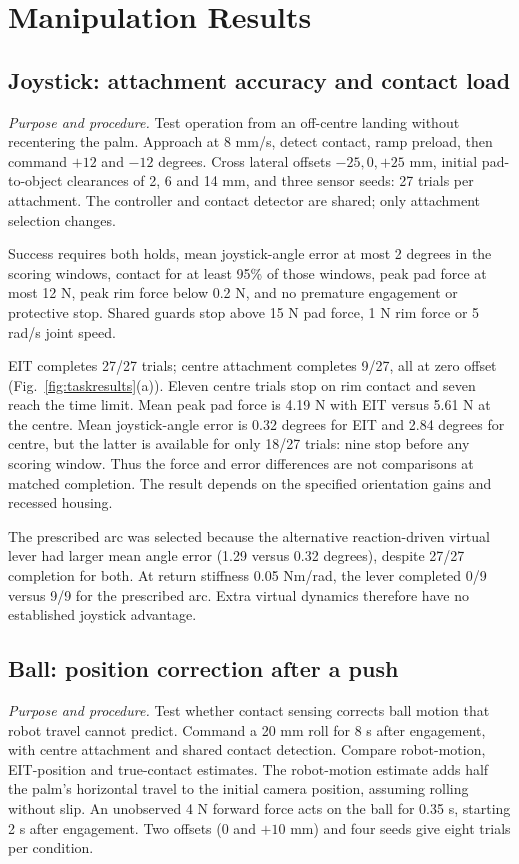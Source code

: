 \documentclass[letterpaper,10pt,conference]{IEEEtran}
\begin{document}
\section{Manipulation Results}\label{sec:tasks}
\subsection{Joystick: attachment accuracy and contact load}
\textit{Purpose and procedure.} Test operation from an off-centre landing without recentering the palm. Approach at 8 mm/s, detect contact, ramp preload, then command $+12$ and $-12$ degrees. Cross lateral offsets $-25,0,+25$ mm, initial pad-to-object clearances of 2, 6 and 14 mm, and three sensor seeds: 27 trials per attachment. The controller and contact detector are shared; only attachment selection changes.

Success requires both holds, mean joystick-angle error at most 2 degrees in the scoring windows, contact for at least 95\% of those windows, peak pad force at most 12 N, peak rim force below 0.2 N, and no premature engagement or protective stop. Shared guards stop above 15 N pad force, 1 N rim force or 5 rad/s joint speed.

EIT completes 27/27 trials; centre attachment completes 9/27, all at zero offset (Fig.~\ref{fig:taskresults}(a)). Eleven centre trials stop on rim contact and seven reach the time limit. Mean peak pad force is 4.19 N with EIT versus 5.61 N at the centre. Mean joystick-angle error is 0.32 degrees for EIT and 2.84 degrees for centre, but the latter is available for only 18/27 trials: nine stop before any scoring window. Thus the force and error differences are not comparisons at matched completion. The result depends on the specified orientation gains and recessed housing.

The prescribed arc was selected because the alternative reaction-driven virtual lever had larger mean angle error (1.29 versus 0.32 degrees), despite 27/27 completion for both. At return stiffness 0.05 Nm/rad, the lever completed 0/9 versus 9/9 for the prescribed arc. Extra virtual dynamics therefore have no established joystick advantage.

\subsection{Ball: position correction after a push}\label{sec:ballfollowup}
\textit{Purpose and procedure.} Test whether contact sensing corrects ball motion that robot travel cannot predict. Command a 20 mm roll for 8 s after engagement, with centre attachment and shared contact detection. Compare robot-motion, EIT-position and true-contact estimates. The robot-motion estimate adds half the palm's horizontal travel to the initial camera position, assuming rolling without slip. An unobserved 4 N forward force acts on the ball for 0.35 s, starting 2 s after engagement. Two offsets (0 and $+10$ mm) and four seeds give eight trials per condition.
\end{document}
